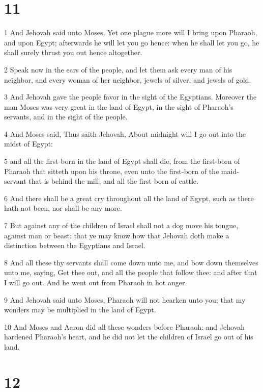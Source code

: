 \chapter{11}

\par 1 And Jehovah said unto Moses, Yet one plague more will I bring upon Pharaoh, and upon Egypt; afterwards he will let you go hence: when he shall let you go, he shall surely thrust you out hence altogether.
\par 2 Speak now in the ears of the people, and let them ask every man of his neighbor, and every woman of her neighbor, jewels of silver, and jewels of gold.
\par 3 And Jehovah gave the people favor in the sight of the Egyptians. Moreover the man Moses was very great in the land of Egypt, in the sight of Pharaoh's servants, and in the sight of the people.
\par 4 And Moses said, Thus saith Jehovah, About midnight will I go out into the midst of Egypt:
\par 5 and all the first-born in the land of Egypt shall die, from the first-born of Pharaoh that sitteth upon his throne, even unto the first-born of the maid-servant that is behind the mill; and all the first-born of cattle.
\par 6 And there shall be a great cry throughout all the land of Egypt, such as there hath not been, nor shall be any more.
\par 7 But against any of the children of Israel shall not a dog move his tongue, against man or beast: that ye may know how that Jehovah doth make a distinction between the Egyptians and Israel.
\par 8 And all these thy servants shall come down unto me, and bow down themselves unto me, saying, Get thee out, and all the people that follow thee: and after that I will go out. And he went out from Pharaoh in hot anger.
\par 9 And Jehovah said unto Moses, Pharaoh will not hearken unto you; that my wonders may be multiplied in the land of Egypt.
\par 10 And Moses and Aaron did all these wonders before Pharaoh: and Jehovah hardened Pharaoh's heart, and he did not let the children of Israel go out of his land.

\chapter{12}

